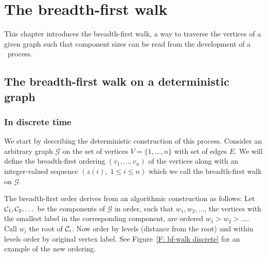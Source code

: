 
\chapter{The breadth-first walk} \label{C: bf-walk}

This chapter introduces the breadth-first walk, 
a way to traverse the vertices of a given graph such that component sizes can be read from the development of a \cadlag~process. 

\section{The breadth-first walk on a deterministic graph}

\subsection{In discrete time}
We start by describing the deterministic construction of this process.
Consider an arbitrary graph $\mathcal{G}$ on the set of vertices 
$V = \{1, \dots , n\} $ with set of edges $E$.
We will define the breadth-first ordering
$(v_1, \dots, v_n)$
of the vertices along with an integer-valued sequence
$(z(i), \; 1 \leq i \leq n)$
which we call the breadth-first walk on
$\mathcal{G}$.


The breadth-first order derives from an algorithmic construction as follows:
Let $\mathcal{C}_{1}, \mathcal{C}_{2}, \dots$ be the components of $\mathcal{G}$ in order, such that
$w_1, w_2, \dots$, the vertices with the smallest label in the corresponding component,
are ordered $w_1 > w_2 > \dots$. 
Call $w_i$ the root of $\mathcal{C}_{i}$.
Now order by levels (distance from the root) and within levels order by original vertex label.
See Figure~\ref{F: bf-walk discrete} for an example of the new ordering.

